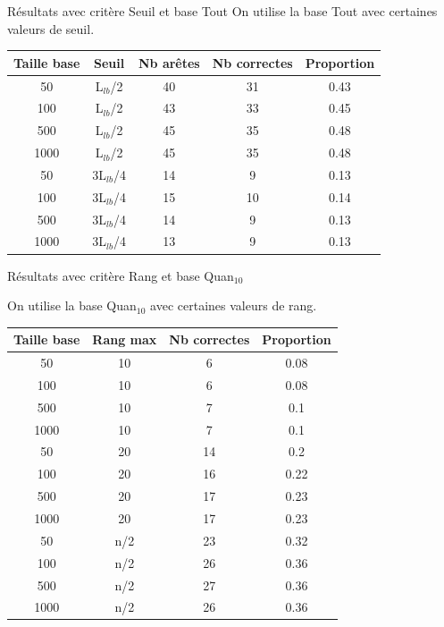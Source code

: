 \documentclass{beamer}
\begin{document}
\begin{frame}{Résultats avec critère Seuil et base Tout}
On utilise la base Tout avec certaines valeurs de seuil.
\begin{tabular}{|c|c|c|c|c|}
   \hline
   Taille base & Seuil & Nb arêtes & Nb correctes & Proportion\\
   \hline
   50 & L$_{lb}$/2 & 40 & 31 & 0.43  \\
   \hline
   100 & L$_{lb}$/2 & 43 & 33 & 0.45  \\
   \hline
   500 & L$_{lb}$/2 & 45 & 35 & 0.48  \\
   \hline
   1000 & L$_{lb}$/2 & 45 & 35 & 0.48  \\
   \hline
   \hline
   50 & 3L$_{lb}$/4 & 14 & 9 & 0.13  \\
   \hline
   100 & 3L$_{lb}$/4 & 15 & 10 & 0.14  \\
   \hline
   500 & 3L$_{lb}$/4 & 14 & 9 & 0.13  \\
   \hline
   1000 & 3L$_{lb}$/4 & 13 & 9 & 0.13  \\
   \hline
\end{tabular}
\end{frame}


\begin{frame}{Résultats avec critère Rang et base Quan$_{10}$}

On utilise la base Quan$_{10}$ avec certaines valeurs de rang.
\begin{tabular}{|c|c|c|c|}
   \hline
   Taille base & Rang max & Nb correctes & Proportion\\
   \hline
   50 & 10  & 6 & 0.08  \\
   \hline
   100 & 10  & 6 & 0.08  \\
   \hline
   500 & 10  & 7 & 0.1  \\
   \hline
   1000 & 10 & 7 & 0.1  \\
   \hline
   \hline
   50 & 20 & 14 & 0.2  \\
   \hline
   100 & 20 & 16 & 0.22  \\
   \hline
   500 & 20 & 17 & 0.23  \\
   \hline
   1000 & 20 & 17 & 0.23  \\
   \hline
   \hline
   50 & n/2 & 23 & 0.32  \\
   \hline
   100 & n/2 & 26 & 0.36  \\
   \hline
   500 & n/2 & 27 & 0.36  \\
   \hline
   1000 & n/2 & 26 & 0.36  \\
   \hline
\end{tabular}

\end{frame}
\end{document}
